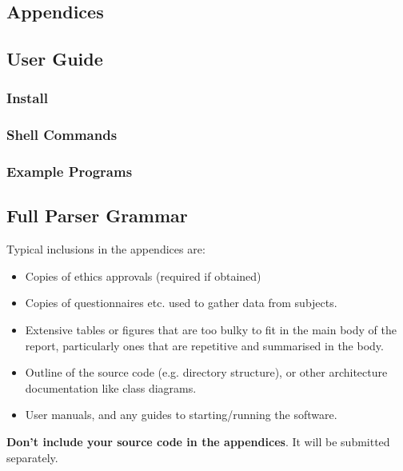 \documentclass{l4proj}
\begin{document}
%
% 

\begin{appendices}

\chapter{Appendices}

\section{User Guide}
\subsection{Install}
\subsection{Shell Commands}
\subsection{Example Programs}
\section{Full Parser Grammar}

Typical inclusions in the appendices are:

\begin{itemize}
\item
  Copies of ethics approvals (required if obtained)
\item
  Copies of questionnaires etc. used to gather data from subjects.
\item
  Extensive tables or figures that are too bulky to fit in the main body of
  the report, particularly ones that are repetitive and summarised in the body.

\item Outline of the source code (e.g. directory structure), or other architecture documentation like class diagrams.

\item User manuals, and any guides to starting/running the software.

\end{itemize}

\textbf{Don't include your source code in the appendices}. It will be
submitted separately.

\end{appendices}






\end{document}

